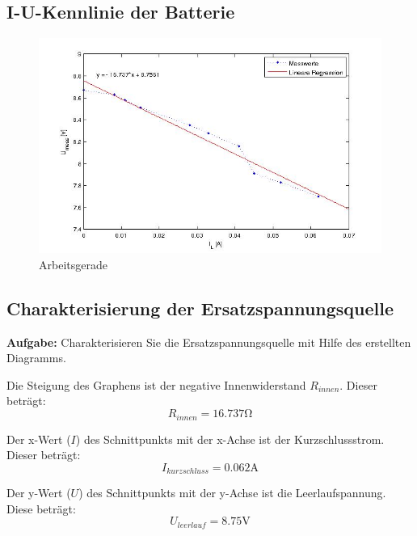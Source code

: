 \documentclass[10pt]{report}
\begin{document}
        \subsection{I-U-Kennlinie der Batterie}
        \begin{center}
            \begin{figure}[H]
              \includegraphics[width=\textwidth]{BatterieKurve.jpg}
              \caption{Arbeitsgerade}
            \end{figure}
        \end{center}

        \subsection{Charakterisierung der Ersatzspannungsquelle}
        \textbf{Aufgabe:} Charakterisieren Sie die Ersatzspannungsquelle mit Hilfe des erstellten Diagramms.

        \vspace{0.5cm}

        Die Steigung des Graphens ist der negative Innenwiderstand $R_{innen}$.
        Dieser beträgt:
        \begin{equation*}
            R_{innen} = 16.737 \si{\ohm}
        \end{equation*}

        Der x-Wert ($I$) des Schnittpunkts mit der x-Achse ist der Kurzschlussstrom.
        Dieser beträgt:
        \begin{equation*}
            I_{kurzschluss} = 0.062 \si{\ampere}
        \end{equation*}

        Der y-Wert ($U$) des Schnittpunkts mit der y-Achse ist die Leerlaufspannung.
        Diese beträgt:
        \begin{equation*}
            U_{leerlauf} = 8.75 \si{\volt}
        \end{equation*}
\end{document}
